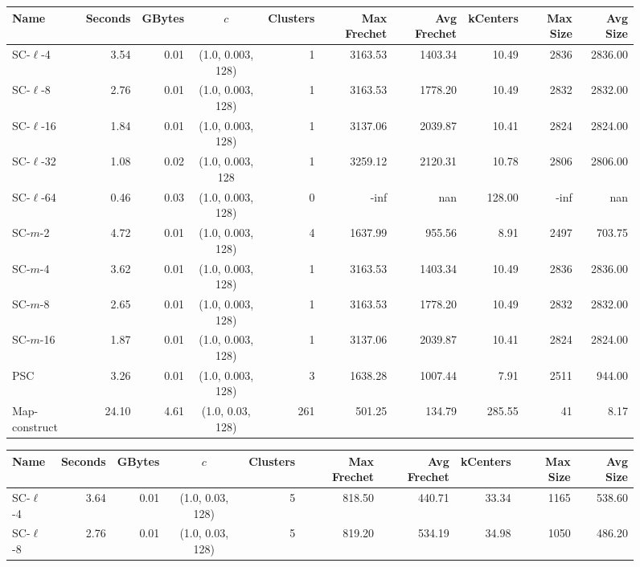 \begin{figure}[h] \begin{center}
        \begin{minipage}{\textwidth}
    {
    \begin{tabular}{@{}lrrcrrrrrr@{}}
        \toprule
        Name & Seconds & GBytes & $c$ & Clusters & Max Frechet & Avg Frechet & kCenters & Max Size & Avg Size\\
        \midrule
        SC-$\ell$-4 & 3.54 & 0.01 & (1.0, 0.003, 128) & 1 & 3163.53 & 1403.34 & 10.49 & 2836 & 2836.00\\
        SC-$\ell$-8 & 2.76 & 0.01 & (1.0, 0.003, 128) & 1 & 3163.53 & 1778.20 & 10.49 & 2832 & 2832.00\\
        SC-$\ell$-16 & 1.84 & 0.01 & (1.0, 0.003, 128) & 1 & 3137.06 & 2039.87 & 10.41 & 2824 & 2824.00\\
        SC-$\ell$-32 & 1.08 & 0.02 & (1.0, 0.003, 128 & 1 & 3259.12 & 2120.31 & 10.78 & 2806 & 2806.00\\
        SC-$\ell$-64 & 0.46 & 0.03 & (1.0, 0.003, 128) & 0 & -inf & nan & 128.00 & -inf & nan\\
        SC-$m$-2 & 4.72 & 0.01 & (1.0, 0.003, 128) & 4 & 1637.99 & 955.56 & 8.91 & 2497 & 703.75\\
        SC-$m$-4 & 3.62 & 0.01 & (1.0, 0.003, 128) & 1 & 3163.53 & 1403.34 & 10.49 & 2836 & 2836.00\\
        SC-$m$-8 & 2.65 & 0.01 & (1.0, 0.003, 128) & 1 & 3163.53 & 1778.20 & 10.49 & 2832 & 2832.00\\
        SC-$m$-16 & 1.87 & 0.01 & (1.0, 0.003, 128) & 1 & 3137.06 & 2039.87 & 10.41 & 2824 & 2824.00\\
        PSC & 3.26 & 0.01 & (1.0, 0.003, 128) & 3 & 1638.28 & 1007.44 & 7.91 & 2511 & 944.00\\
        Map-construct & 24.10 & 4.61 & (1.0, 0.03, 128) & 261 & 501.25 & 134.79 & 285.55 & 41 & 8.17\\
        \bottomrule
    \end{tabular}}
%
    {
    \begin{tabular}{@{}lrrcrrrrrr@{}}
        \toprule
        Name & Seconds & GBytes & $c$ & Clusters & Max Frechet & Avg Frechet & kCenters & Max Size & Avg Size\\
        \midrule
        SC-$\ell$-4 & 3.64 & 0.01 & (1.0, 0.03, 128) & 5 & 818.50 & 440.71 & 33.34 & 1165 & 538.60\\
        SC-$\ell$-8 & 2.76 & 0.01 & (1.0, 0.03, 128) & 5 & 819.20 & 534.19 & 34.98 & 1050 & 486.20\\

\end{tabular}}
\end{minipage}
\end{center}
\end{figure}
